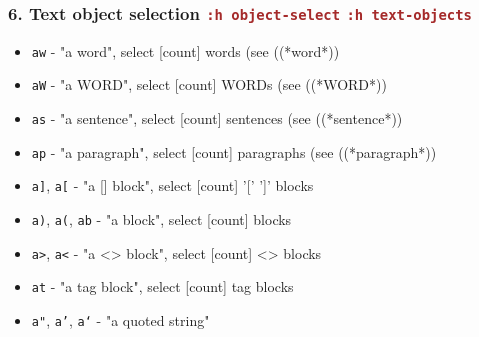 \documentclass{beamer}
\newcommand{\vimcommand}[1]{\texttt{\textcolor{brown}{#1}}}
\newcommand{\vimhelp}[1]{\vimcommand{:h #1}}
\begin{document}
\begin{frame}
    \frametitle{6. Text object selection \vimhelp{object-select} \vimhelp{text-objects}}
    \begin{itemize}
        \item \texttt{aw}                                     - "a word", select [count] words (see (\textrm(*word*))
        \item \texttt{aW}                                     - "a WORD", select [count] WORDs (see (\textrm(*WORD*))
        \item \texttt{as}                                     - "a sentence", select [count] sentences (see (\textrm(*sentence*))
        \item \texttt{ap}                                     - "a paragraph", select [count] paragraphs (see (\textrm(*paragraph*))
        \item \texttt{a]}, \texttt{a[}                        - "a [] block", select [count] '[' ']' blocks
        \item \texttt{a)}, \texttt{a(}, \texttt{ab}           - "a block", select [count] blocks
        \item \texttt{a\textgreater{}}, \texttt{a\textless{}} - "a \textless{}\textgreater{} block", select [count] \textless{}\textgreater{} blocks
        \item \texttt{at}                                     - "a tag block", select [count] tag blocks
        \item \texttt{a"}, \texttt{a'}, \texttt{a`}           - "a quoted string"
    \end{itemize}
\end{frame}
\end{document}
